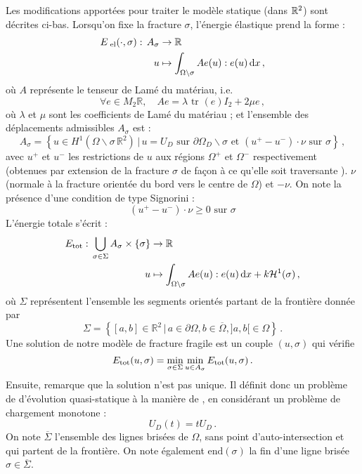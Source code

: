 Les modifications apportées pour traiter le modèle statique (dans $\mathbb{R}^2$) sont décrites ci-bas. Lorsqu'on fixe la fracture $\sigma$, l'énergie élastique prend la forme :
\begin{align*}
\eel (\cdot,\sigma): \, A_{\sigma} &\rightarrow \mathbb{R} \\
u &\mapsto \int_{\Omega \backslash \sigma} Ae(u) : e(u) \diff x \,,
\end{align*}
où $A$ représente le tenseur de Lamé du matériau, i.e.
$$
    \forall e \in M_2{\mathbb{R}}, \quad Ae = \lambda \text{ tr }(e)I_2 + 2\mu e \,,
$$ 
où $\lambda$ et $\mu$ sont les coefficients de Lamé du matériau ; et l'ensemble des déplacements admissibles $A_{\sigma}$ est :
$$
A_{\sigma} = \left\{  u \in H^1(\Omega \backslash \sigma \, \mathbb{R}^2) \, \rvert \, u=U_D \text{ sur } \partial \Omega_D \backslash \sigma \text{ et } (u^+ - u^{-}) \cdot \nu \text{ sur } \sigma \right\} \,,
$$
avec $u^{+}$ et $u^{−}$ les restrictions de $u$ aux régions $\Omega^{+}$ et $\Omega^{-}$ respectivement (obtenues par extension de la fracture $\sigma$ de façon à ce qu'elle soit traversante \parencite[p.52]{balasoiu2020halthesis}). $\nu$ (normale à la fracture orientée du bord vers le centre de $\Omega$) et $−\nu$. On note la présence d'une condition de type Signorini :
$$
(u^+ - u^{-}) \cdot \nu \geq 0 \text{  sur  } \sigma
$$
L'énergie totale s'écrit :
\begin{align*}
\etot : \,\bigcup_{\sigma \in \Sigma } A_{\sigma} \times \left\{ \sigma \right\} &\rightarrow \mathbb{R} \\
 u &\mapsto \int_{\Omega \backslash \sigma} Ae(u) : e(u) \diff x + k\mathcal{H}^1(\sigma)\,,
\end{align*}
où $\Sigma$ représentent l'ensemble les segments orientés partant de la frontière donnée par 
$$
\Sigma = \left\{ [a,b] \in \mathbb{R}^2 \, \lvert \, a \in \partial\Omega, b\in \overline{\Omega}, ]a,b[ \in \Omega\right\} \,.
$$
Une solution de notre modèle de fracture fragile est un couple $(u, \sigma)$ qui vérifie
$$
E_{\text{\upshape tot}}(u,\sigma) = \min_{\sigma \in \Sigma}{\min_{u\in A_{\sigma}}{E_{\text{\upshape tot}}(u,\sigma)}} \,.
$$
Ensuite, \citeauthor{balasoiu2020halthesis} remarque que la solution n'est pas unique. Il définit donc un problème de d'évolution quasi-statique à la manière de \parencite{francfort1998revisiting}, en considérant un problème de chargement monotone : 
$$
U_D(t) = tU_D \,.
$$
On note $\overline{\Sigma}$ l’ensemble des lignes brisées de $\Omega$, sans point d’auto-intersection et qui partent de la frontière. On note également $\text{end}(\sigma)$ la fin d’une ligne brisée $\sigma \in  \overline{\Sigma}$.
